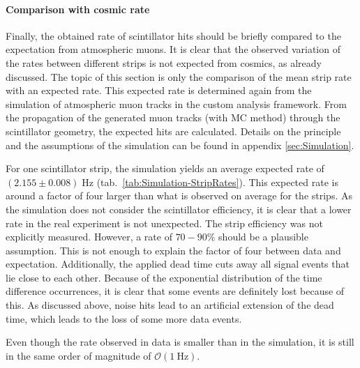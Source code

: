 \paragraph{Comparison with cosmic rate}
Finally, the obtained rate of scintillator hits should be briefly compared to the expectation from atmospheric muons. It is clear that the observed variation of the rates between different strips is not expected from cosmics, as already discussed. The topic of this section is only the comparison of the mean strip rate with an expected rate. This expected rate is determined again from the simulation of atmospheric muon tracks in the custom analysis framework. From the propagation of the generated muon tracks (with \acl{MC} method) through the scintillator geometry, the expected hits are calculated. Details on the principle and the assumptions of the simulation can be found in appendix \ref{sec:Simulation}.
\par For one scintillator strip, the simulation yields an average expected rate of $(2.155 \pm 0.008)\;\si{\hertz}$ (tab.\ \ref{tab:Simulation-StripRates}). This expected rate is around a factor of four larger than what is observed on average for the strips. As the simulation does not consider the scintillator efficiency, it is clear that a lower rate in the real experiment is not unexpected. The strip efficiency was not explicitly measured. However, a rate of $70-90\%$ should be a plausible assumption. This is not enough to explain the factor of four between data and expectation. Additionally, the applied dead time cuts away all signal events that lie close to each other. Because of the exponential distribution of the time difference occurrences, it is clear that some events are definitely lost because of this. As discussed above, noise hits lead to an artificial extension of the dead time, which leads to the loss of some more data events.
\par Even though the rate observed in data is smaller than in the simulation, it is still in the same order of magnitude of $\mathcal{O}(\SI{1}{\hertz})$.

